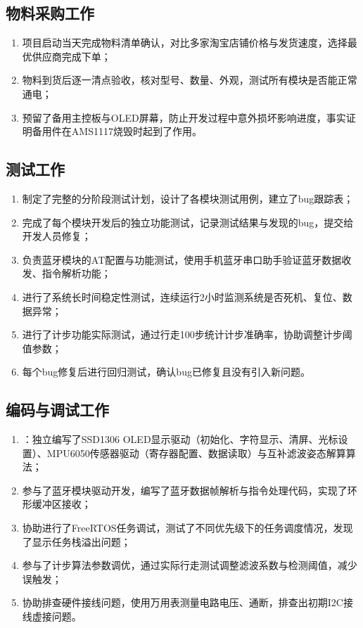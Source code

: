 \documentclass[12pt, a4paper]{ctexart}
\begin{document}
\subsection{物料采购工作}
\begin{enumerate}
    \item 项目启动当天完成物料清单确认，对比多家淘宝店铺价格与发货速度，选择最优供应商完成下单；
    \item 物料到货后逐一清点验收，核对型号、数量、外观，测试所有模块是否能正常通电；
    \item 预留了备用主控板与OLED屏幕，防止开发过程中意外损坏影响进度，事实证明备用件在AMS1117烧毁时起到了作用。
\end{enumerate}

\subsection{测试工作}
\begin{enumerate}
    \item 制定了完整的分阶段测试计划，设计了各模块测试用例，建立了bug跟踪表；
    \item 完成了每个模块开发后的独立功能测试，记录测试结果与发现的bug，提交给开发人员修复；
    \item 负责蓝牙模块的AT配置与功能测试，使用手机蓝牙串口助手验证蓝牙数据收发、指令解析功能；
    \item 进行了系统长时间稳定性测试，连续运行2小时监测系统是否死机、复位、数据异常；
    \item 进行了计步功能实际测试，通过行走100步统计计步准确率，协助调整计步阈值参数；
    \item 每个bug修复后进行回归测试，确认bug已修复且没有引入新问题。
\end{enumerate}

\subsection{编码与调试工作}
\begin{enumerate}
    \item ：独立编写了SSD1306 OLED显示驱动（初始化、字符显示、清屏、光标设置）、MPU6050传感器驱动（寄存器配置、数据读取）与互补滤波姿态解算算法；
    \item 参与了蓝牙模块驱动开发，编写了蓝牙数据帧解析与指令处理代码，实现了环形缓冲区接收；
    \item 协助进行了FreeRTOS任务调试，测试了不同优先级下的任务调度情况，发现了显示任务栈溢出问题；
    \item 参与了计步算法参数调优，通过实际行走测试调整滤波系数与检测阈值，减少误触发；
    \item 协助排查硬件接线问题，使用万用表测量电路电压、通断，排查出初期I2C接线虚接问题。
\end{enumerate}
\end{document}
